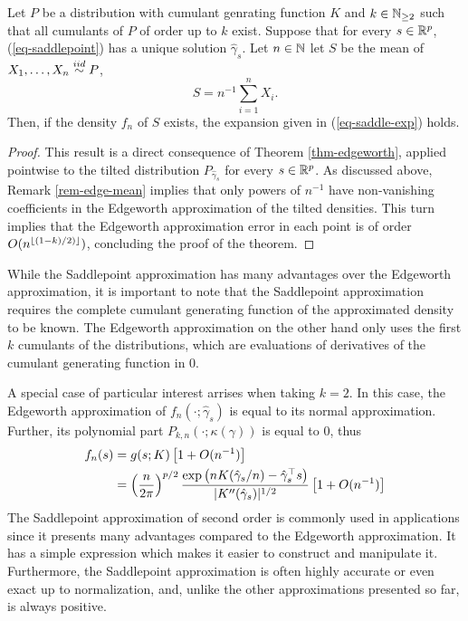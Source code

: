 \begin{theorem}
    Let $P$ be a distribution with cumulant genrating function $K$ and $k \in \mathbb{N}_{\geq 2}$ such that all cumulants of $P$ of order up to $k$ exist. Suppose that for every $s \in {\mathbb{R}^p}$, (\ref{eq-saddlepoint}) has a unique solution $\hat\gamma_s$. Let $n \in \mathbb{N}$ let $S$ be the mean of $X_1, \ldots, X_n \stackrel{iid}{\sim} P$,
    \begin{equation*}
        S = n^{-1} \sum_{i=1}^n X_i.
    \end{equation*}
    Then, if the density $f_n$ of $S$ exists, the expansion given in (\ref{eq-saddle-exp}) holds.
\end{theorem}
\begin{proof}
    This result is a direct consequence of Theorem \ref{thm-edgeworth}, applied pointwise to the tilted distribution $P_{\hat\gamma_s}$ for every $s \in {\mathbb{R}^p}$. As discussed above, Remark \ref{rem-edge-mean} implies that only powers of $n^{-1}$ have non-vanishing coefficients in the Edgeworth approximation of the tilted densities. This turn implies that the Edgeworth approximation error in each point is of order $O(n^{\lfloor(1-k)/2)\rfloor})$, concluding the proof of the theorem.
\end{proof}

While the Saddlepoint approximation has many advantages over the Edgeworth approximation, it is important to note that the Saddlepoint approximation requires the complete cumulant generating function of the approximated density to be known. The Edgeworth approximation on the other hand only uses the first $k$ cumulants of the distributions, which are evaluations of derivatives of the cumulant generating function in 0. 

A special case of particular interest arrises when taking $k = 2$. In this case, the Edgeworth approximation of $f_n(\cdot; \hat\gamma_s)$ is equal to its normal approximation. Further, its polynomial part $P_{k, n}(\cdot; \kappa(\gamma))$ is equal to 0, thus
\begin{align} \label{eq-saddle-3}
    f_n(s) &= g(s; K)\left[1 + O(n^{-1})\right]\nonumber\\
    &= \left(\frac{n}{2\pi}\right)^{p/2} \frac{\exp\left(nK(\hat\gamma_s / n) - \hat\gamma_s^\top s\right)}{|K''(\hat\gamma_s)|^{1/2}} \left[1 + O(n^{-1})\right]
\end{align}
The Saddlepoint approximation of second order is commonly used in applications since it presents many advantages compared to the Edgeworth approximation. It has a simple expression which makes it easier to construct and manipulate it. Furthermore, the Saddlepoint approximation is often highly accurate or even exact up to normalization, and, unlike the other approximations presented so far, is always positive.

